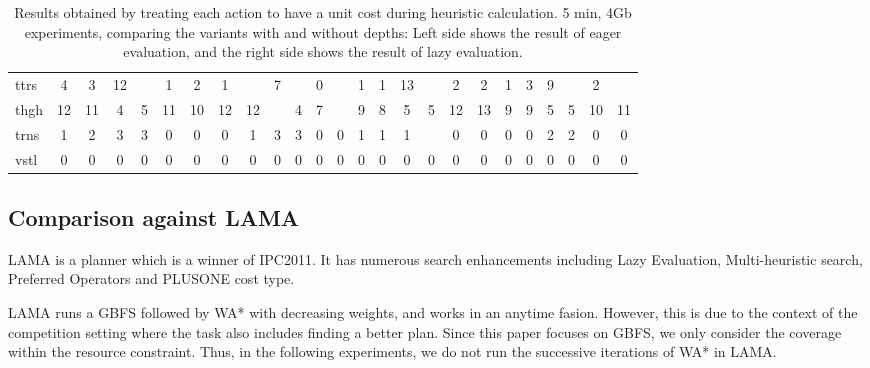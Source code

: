 \begin{table}[htbp]
\begin{tabular}{|l*{2}{*{3}{|cc}|}*{2}{*{3}{|cc}|}}
ttrs & 4 & 3 & 12 &  & 1 & 2 & 1 &  & 7 &  & 0 &  & 1 & 1 & 13 &  & 2 & 2 & 1 & 3 & 9 &  & 2 & \\
thgh & 12 & 11 & 4 & 5 & 11 & 10 & 12 & 12 &  & 4 & 7 &  & 9 & 8 & 5 & 5 & 12 & 13 & 9 & 9 & 5 & 5 & 10 & 11\\
trns & 1 & 2 & 3 & 3 & 0 & 0 & 0 & 1 & 3 & 3 & 0 & 0 & 1 & 1 & 1 &  & 0 & 0 & 0 & 0 & 2 & 2 & 0 & 0\\
vstl & 0 & 0 & 0 & 0 & 0 & 0 & 0 & 0 & 0 & 0 & 0 & 0 & 0 & 0 & 0 & 0 & 0 & 0 & 0 & 0 & 0 & 0 & 0 & 0\\
\hline
\end{tabular}
\caption{Results obtained by treating each action to have a unit cost
 during heuristic calculation.
 5 min, 4Gb experiments, comparing the variants with
 and without depths:
 Left side shows the result of eager evaluation, and the right side shows
 the result of lazy evaluation.
 }
\end{table}




\subsection{Comparison against LAMA}

LAMA \cite{richter2010lama} is a \sota planner which is a winner of
IPC2011. It has numerous search enhancements including Lazy Evaluation,
Multi-heuristic search, Preferred Operators and PLUSONE cost type.

LAMA runs a GBFS followed by WA* with decreasing weights, and works in
an anytime fasion. However, this is due to the context of the
competition setting where the task also includes finding a better plan.
Since this paper focuses on GBFS, we only consider 
the coverage within the resource constraint. Thus, in the following
experiments, we do not run the successive iterations of WA* in LAMA.

